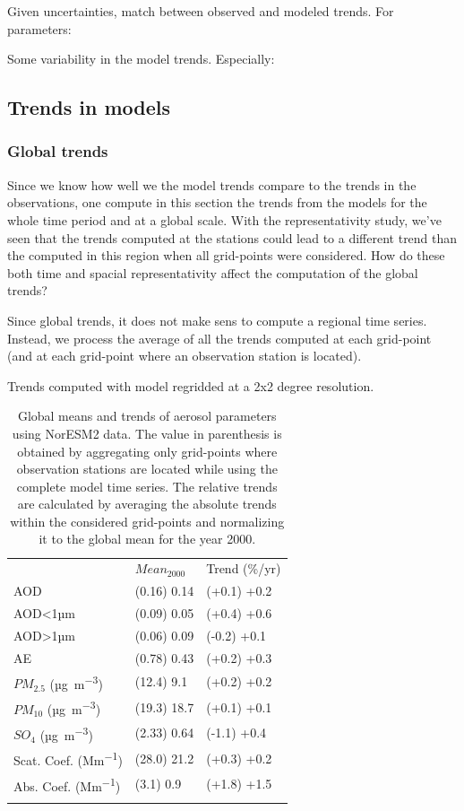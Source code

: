 \documentclass[journal abbreviation, manuscript]{copernicus}
\begin{document}
Given uncertainties, match between observed and modeled trends. For parameters:

Some variability in the model trends. Especially:




\subsection{Trends in models}

\subsubsection{Global trends}
Since we know how well we the model trends compare to the trends in the observations, one compute in this section the trends from the models for the whole time period and at a global scale. With the representativity study, we've seen that the trends computed at the stations could lead to a different trend than the computed in this region when all grid-points were considered. How do these both time and spacial representativity affect the computation of the global trends?

Since global trends, it does not make sens to compute a regional time series. Instead, we process the average of all the trends computed at each grid-point (and at each grid-point where an observation station is located).

Trends computed with model regridded at a 2x2 degree resolution.
\begin{table}
 \begin{tabular}{lll}
  \tophline
                                & $Mean_{2000}$ & Trend (\%/yr) \\
  \middlehline
  AOD                           & (0.16) 0.14   & (+0.1) +0.2   \\
  AOD<1µm                       & (0.09) 0.05   & (+0.4) +0.6   \\
  AOD>1µm                       & (0.06) 0.09   & (-0.2) +0.1   \\
  AE                            & (0.78) 0.43   & (+0.2) +0.3   \\
  $PM_{2.5}$ (\unit{µg.m^{-3}}) & (12.4) 9.1    & (+0.2) +0.2   \\
  $PM_{10}$ (\unit{µg.m^{-3}})  & (19.3) 18.7   & (+0.1) +0.1   \\
  $SO_{4}$ (\unit{µg.m^{-3}})   & (2.33) 0.64   & (-1.1) +0.4   \\
  Scat. Coef. (\unit{Mm^{-1}})  & (28.0) 21.2   & (+0.3) +0.2   \\
  Abs. Coef. (\unit{Mm^{-1}})   & (3.1) 0.9     & (+1.8) +1.5   \\
  \bottomhline
 \end{tabular}
 \caption{Global means and trends of aerosol parameters using NorESM2 data. The value in parenthesis is obtained by aggregating only grid-points where observation stations are located while using the complete model time series. The relative trends are calculated by averaging the absolute trends within the considered grid-points and normalizing it to the global mean for the year 2000.}
 \label{mod_tab_trends}
\end{table}
\end{document}
